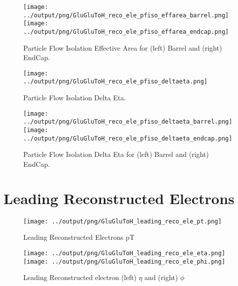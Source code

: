 \documentclass[11pt]{book}
\begin{document}
\begin{figure}[ht]
\centering
\texttt{[image: ../output/png/GluGluToH\_reco\_ele\_pfiso\_effarea\_barrel.png]}
\texttt{[image: ../output/png/GluGluToH\_reco\_ele\_pfiso\_effarea\_endcap.png]}
\caption{Particle Flow Isolation Effective Area for (left) Barrel and (right) EndCap.}
\label{fig:gluglu_reco_ele_pfiso_effarea_regions}
\end{figure}

\begin{figure}[ht]
\centering
\texttt{[image: ../output/png/GluGluToH\_reco\_ele\_pfiso\_deltaeta.png]}
\caption{Particle Flow Isolation Delta Eta.}
\label{fig:gluglu_reco_ele_pfiso_deltaeta}
\end{figure}

\begin{figure}[ht]
\centering
\texttt{[image: ../output/png/GluGluToH\_reco\_ele\_pfiso\_deltaeta\_barrel.png]}
\texttt{[image: ../output/png/GluGluToH\_reco\_ele\_pfiso\_deltaeta\_endcap.png]}
\caption{Particle Flow Isolation Delta Eta for (left) Barrel and (right) EndCap.}
\label{fig:gluglu_reco_ele_pfiso_deltaeta_regions}
\end{figure}

\clearpage


\section{Leading Reconstructed Electrons}

\begin{figure}[ht]
\centering
\texttt{[image: ../output/png/GluGluToH\_leading\_reco\_ele\_pt.png]}
\caption{Leading Reconstructed Electrons pT}
\label{fig:gluglu_leading_reco_ele_pt}
\end{figure}

\begin{figure}[ht]
\centering
\texttt{[image: ../output/png/GluGluToH\_leading\_reco\_ele\_eta.png]}
\texttt{[image: ../output/png/GluGluToH\_leading\_reco\_ele\_phi.png]}
\caption{Leading Reconstructed electron (left) $\eta$ and (right) $\phi$}
\label{fig:gluglu_leading_reco_ele_eta_phi}
\end{figure}


 
\end{document}
